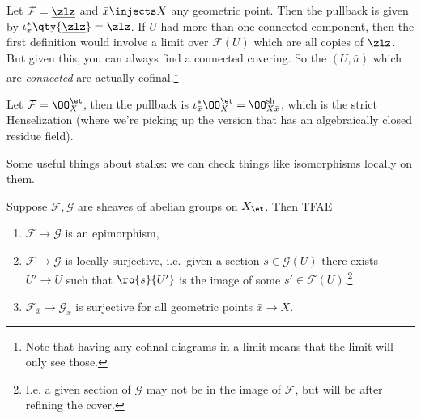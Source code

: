 \begin{example}[?]

Let \(\mathcal{F} = \underline{\zlz}\) and \(\bar x\injects X\) any
geometric point. Then the pullback is given by
\(\iota_{\bar x}^* \qty{\underline{\zlz}} = \zlz\). If \(U\) had more
than one connected component, then the first definition would involve a
limit over \(\mathcal{F}(U)\) which are all copies of \(\zlz\). But
given this, you can always find a connected covering. So the
\((U, \bar u)\) which are \emph{connected} are actually
cofinal.\footnote{Note that having any cofinal diagrams in a limit means
  that the limit will only see those.}

\end{example}

\begin{example}[?]

Let \(\mathcal{F} = \OO_{X}^{\et}\), then the pullback is
\(\iota_{\bar x}^* \OO_X^{\et} = \OO_{X\bar x}^{\mathrm{sh}}\), which is
the strict Henselization (where we're picking up the version that has an
algebraically closed residue field).

\end{example}

Some useful things about stalks: we can check things like isomorphisms
locally on them.

\begin{lemma}[?]

Suppose \(\mathcal{F}, \mathcal{G}\) are sheaves of abelian groups on
\(X_{\et}\). Then TFAE

\begin{enumerate}
\def\labelenumi{\arabic{enumi}.}
\tightlist
\item
  \(\mathcal{F}\to \mathcal{G}\) is an epimorphism,
\item
  \(\mathcal{F}\to \mathcal{G}\) is locally surjective, i.e.~given a
  section \(s\in \mathcal{G}(U)\) there exists \(U'\to U\) such that
  \(\ro{s}{U'}\) is the image of some
  \(s' \in \mathcal{F}(U)\).\footnote{I.e. a given section of
    \(\mathcal{G}\) may not be in the image of \(\mathcal{F}\), but will
    be after refining the cover.}
\item
  \(\mathcal{F}_{\bar x} \to \mathcal{G}_{\bar x}\) is surjective for
  all geometric points \(\bar x\to X\).
\end{enumerate}

\end{lemma}

